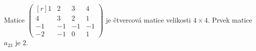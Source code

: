 \begin{mdframed}[style=mdexam]
  \begin{example}\label{mai:exam033}
    Matice \(\begin{pmatrix*}[r]1&2&3&4\\4&3&2&1\\-1&-1&-1&-1\\-2&-1&0&1\end{pmatrix*}\) je čtvercová 
    matice velikosti \(4\times4\). Prvek matice \(a_{23}\) je \(2\).
  \end{example}
\end{mdframed}